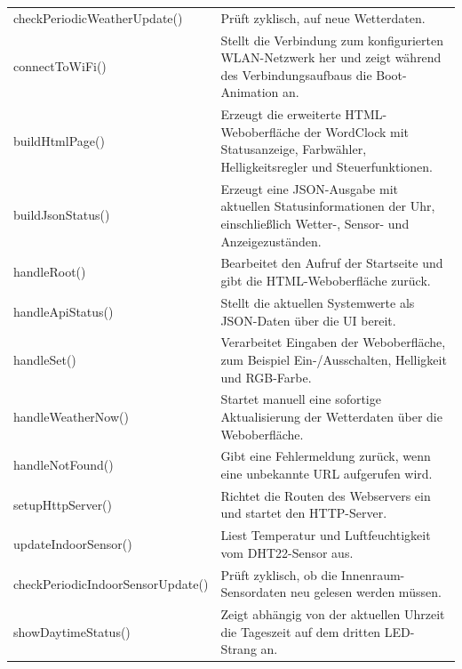 \begin{longtable}{p{} p{}}
{\small\ttfamily checkPeriodicWeatherUpdate()} &
Prüft zyklisch, auf neue Wetterdaten. \\

{\small\ttfamily connectToWiFi()} &
Stellt die Verbindung zum konfigurierten WLAN-Netzwerk her und zeigt während des Verbindungsaufbaus die Boot-Animation an. \\

{\small\ttfamily buildHtmlPage()} &
Erzeugt die erweiterte HTML-Weboberfläche der WordClock mit Statusanzeige, Farbwähler, Helligkeitsregler und Steuerfunktionen. \\

{\small\ttfamily buildJsonStatus()} &
Erzeugt eine JSON-Ausgabe mit aktuellen Statusinformationen der Uhr, einschließlich Wetter-, Sensor- und Anzeigezuständen. \\

{\small\ttfamily handleRoot()} &
Bearbeitet den Aufruf der Startseite und gibt die HTML-Weboberfläche zurück. \\

{\small\ttfamily handleApiStatus()} &
Stellt die aktuellen Systemwerte als JSON-Daten über die UI bereit. \\

{\small\ttfamily handleSet()} &
Verarbeitet Eingaben der Weboberfläche, zum Beispiel Ein-/Ausschalten, Helligkeit und RGB-Farbe. \\

{\small\ttfamily handleWeatherNow()} &
Startet manuell eine sofortige Aktualisierung der Wetterdaten über die Weboberfläche. \\

{\small\ttfamily handleNotFound()} &
Gibt eine Fehlermeldung zurück, wenn eine unbekannte URL aufgerufen wird. \\

{\small\ttfamily setupHttpServer()} &
Richtet die Routen des Webservers ein und startet den HTTP-Server. \\

{\small\ttfamily updateIndoorSensor()} &
Liest Temperatur und Luftfeuchtigkeit vom DHT22-Sensor aus. \\

{\small\ttfamily checkPeriodicIndoorSensorUpdate()} &
Prüft zyklisch, ob die Innenraum-Sensordaten neu gelesen werden müssen. \\

{\small\ttfamily showDaytimeStatus()} &
Zeigt abhängig von der aktuellen Uhrzeit die Tageszeit auf dem dritten LED-Strang an. \\


\end{longtable}
